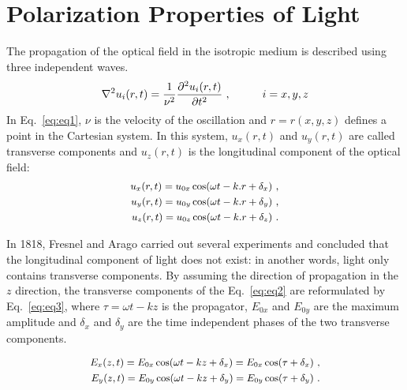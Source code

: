 \section{Polarization Properties of Light}\label{sec:chp4-sec2}
The propagation of the optical field in the isotropic medium is described using three independent waves.
\begin{equation} 
\small
 	\nabla^{2} u_{i}(r,t) = \frac{1}{\nu^{2}}\frac{\partial^{2}u_{i}(r,t)}{\partial t^{2}}~,  \hspace{1cm}   i = x, y, z 
\label{eq:eq1}
\end{equation}
\noindent In Eq.~\ref{eq:eq1}, $\nu$ is the velocity of the oscillation and $r = r(x,y,z)$ defines a point in the Cartesian system.
In this system, $u_{x}(r,t)$ and $u_{y}(r,t)$ are called transverse components and $u_{z}(r,t)$ is the longitudinal component of the optical field:
\begin{subequations} \label{eq:eq2}
\small
	\begin{align}
 		u_{x}(r,t) =  u_{0x} \cos(\omega t - k . r + \delta_{x})~,\\
 		u_{y}(r,t) =  u_{0y} \cos(\omega t - k . r + \delta_{y})~,\\
 		u_{z}(r,t) =  u_{0z} \cos(\omega t - k . r + \delta_{z})~. 
 	\end{align}
\end{subequations}
 
In 1818, Fresnel and Arago carried out several experiments and concluded that the longitudinal component of light does not exist: in another words, light only contains transverse components.
By assuming the direction of propagation in the $z$ direction, the transverse components of the Eq.~\ref{eq:eq2} are reformulated by Eq.~\ref{eq:eq3}, where $\tau = \omega t - kz$ is the propagator, $E_{0x}$ and $E_{0y}$ are the maximum amplitude and $\delta_{x}$ and $\delta_{y}$ are the time independent phases of the two transverse components.

 \begin{subequations} \label{eq:eq3}
 \small
\begin{align}
 	E_{x}(z,t) = E_{0x} \cos(\omega t - kz+ \delta_{x})= E_{0x} \cos(\tau + \delta_{x})~,\\
 	E_{y}(z,t) = E_{0y} \cos(\omega t - kz + \delta_{y}) = E_{0y} \cos(\tau + \delta_{y})~.
 \end{align}
\end{subequations}
 
